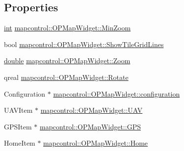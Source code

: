 \subsection*{Properties}
\begin{DoxyCompactItemize}
\item 
\hyperlink{ioapi_8h_a787fa3cf048117ba7123753c1e74fcd6}{int} \hyperlink{group___o_p_map_widget_gac91f92751a3ac3a5a10a6592d4213d42}{mapcontrol\-::\-O\-P\-Map\-Widget\-::\-Min\-Zoom}
\item 
bool \hyperlink{group___o_p_map_widget_ga41a15a2c8198b2ad76d2b494917a02ed}{mapcontrol\-::\-O\-P\-Map\-Widget\-::\-Show\-Tile\-Grid\-Lines}
\item 
\hyperlink{_super_l_u_support_8h_a8956b2b9f49bf918deed98379d159ca7}{double} \hyperlink{group___o_p_map_widget_gadc46820d44c2517e9a6014ddede98099}{mapcontrol\-::\-O\-P\-Map\-Widget\-::\-Zoom}
\item 
qreal \hyperlink{group___o_p_map_widget_gac0960d6e34ea06d84ddad72f930a3917}{mapcontrol\-::\-O\-P\-Map\-Widget\-::\-Rotate}
\item 
Configuration $\ast$ \hyperlink{group___o_p_map_widget_gaa79e123990d6d7b2f1c45e5c2a56313d}{mapcontrol\-::\-O\-P\-Map\-Widget\-::configuration}
\item 
U\-A\-V\-Item $\ast$ \hyperlink{group___o_p_map_widget_gabb5c6c7e07970a7f9b774ebf94cd2286}{mapcontrol\-::\-O\-P\-Map\-Widget\-::\-U\-A\-V}
\item 
G\-P\-S\-Item $\ast$ \hyperlink{group___o_p_map_widget_ga83798c623babeffb173d483ad1c84ccc}{mapcontrol\-::\-O\-P\-Map\-Widget\-::\-G\-P\-S}
\item 
Home\-Item $\ast$ \hyperlink{group___o_p_map_widget_ga3c39e182c87b25990664fbe7dd0a9eff}{mapcontrol\-::\-O\-P\-Map\-Widget\-::\-Home}
\end{DoxyCompactItemize}
